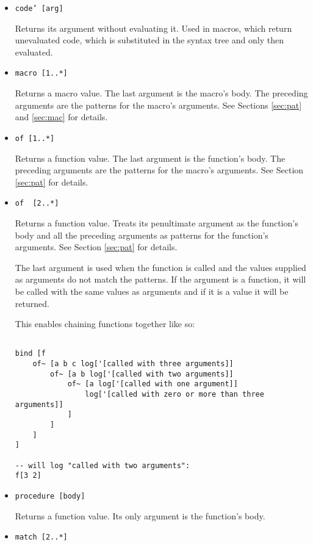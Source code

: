 \begin{itemize}
    \item \texttt{code' [arg]}
    
    Returns its argument without evaluating it. Used in macros, which return unevaluated code, which is substituted in the syntax tree and only then evaluated.
    
    \item \texttt{macro [1..*]}
    
    Returns a macro value. The last argument is the macro's body. The preceding arguments are the patterns for the macro's arguments. See Sections \ref{sec:pat} and \ref{sec:mac} for details.
    
    \item \texttt{of [1..*]}
    
    Returns a function value. The last argument is the function's body. The preceding arguments are the patterns for the macro's arguments. See Section \ref{sec:pat} for details.
    
    \item \texttt{of~ [2..*]} 
    
    Returns a function value. Treats its penultimate argument as the function's body and all the preceding arguments as patterns for the function's arguments. See Section \ref{sec:pat} for details.
    
    The last argument is used when the function is called and the values supplied as arguments do not match the patterns. If the argument is a function, it will be called with the same values as arguments and if it is a value it will be returned.
    
    This enables chaining functions together like so:
\begin{lstlisting}

bind [f
    of~ [a b c log['[called with three arguments]]
        of~ [a b log['[called with two arguments]]
            of~ [a log['[called with one argument]]
                log['[called with zero or more than three arguments]]
            ]
        ]
    ]
]

-- will log "called with two arguments":
f[3 2]
\end{lstlisting}
    
    \item \texttt{procedure [body]}
    
    Returns a function value. Its only argument is the function's body.
    
    \item \texttt{match [2..*]}
    

\end{itemize}
